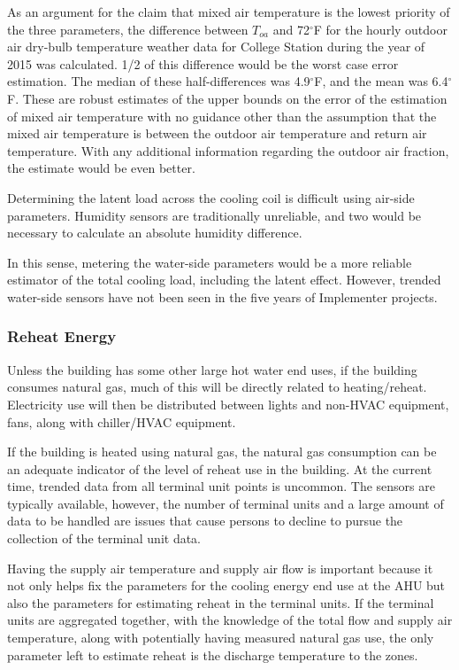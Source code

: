 As an argument for the claim that mixed air temperature is the lowest priority of
the three parameters, the difference between \(T_{oa}\) and 72\(^\circ\)F
for the hourly outdoor air dry-bulb temperature weather data for College
Station during the year of 2015 was calculated. 1/2 of this
difference would be the worst case error estimation. The median of these
half-differences was 4.9\(^\circ\)F, and the mean was 6.4\(^\circ\)F.
These are robust estimates of the upper bounds on the error of the
estimation of mixed air temperature with no guidance other than the assumption
that the mixed air temperature is between the outdoor air temperature and return
air temperature. With any additional information regarding the outdoor
air fraction, the estimate would be even better. 

Determining the latent load across the cooling coil is difficult using
air-side parameters. Humidity sensors are traditionally unreliable, and
two would be necessary to calculate an absolute humidity
difference.

In this sense, metering the water-side parameters would be a more
reliable estimator of the total cooling load, including the latent
effect. However, trended water-side sensors have not been seen in the
five years of Implementer projects.

\subsubsection{Reheat Energy}

Unless the building has some other large hot water end uses, if the
building consumes natural gas, much of this will be directly related to
heating/reheat. Electricity use will then be distributed between lights
and non-HVAC equipment, fans, along with chiller/HVAC equipment. 

If the building is heated using natural gas, the natural gas consumption
can be an adequate indicator of the level of reheat use in the building.
At the current time, trended data from all terminal unit points is
uncommon. The sensors are typically available, however, the number of
terminal units and a large amount of data to be handled are issues that
cause persons to decline to pursue the collection of the terminal unit
data.

Having the supply air temperature and supply air flow is important
because it not only helps fix the parameters for the cooling energy end
use at the AHU but also the parameters for estimating reheat in the
terminal units. If the terminal units are aggregated together, with the
knowledge of the total flow and supply air temperature, along with
potentially having measured natural gas use, the only parameter left to
estimate reheat is the discharge temperature to the zones. 

